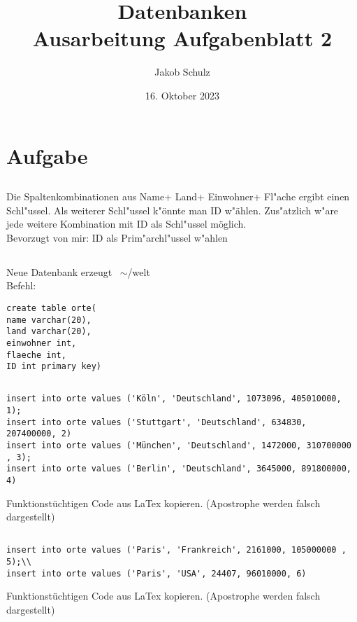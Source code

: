 \documentclass[a4paper,11pt,titlepage]{article}
\begin{document}
\title{Datenbanken\\
Ausarbeitung Aufgabenblatt 2}


\author{Jakob Schulz}


\date{16. Oktober 2023}

\maketitle{\thispagestyle{plain}}

\section{Aufgabe}

\subsection{}
Die Spaltenkombinationen aus Name+ Land+ Einwohner+ Fl"ache ergibt einen Schl"ussel. Als weiterer Schl"ussel k"önnte man ID w"ählen. Zus"atzlich w"are jede weitere Kombination mit ID als Schl"ussel möglich.\\
Bevorzugt von mir: ID als Prim"archl"ussel w"ahlen
\subsection{}
Neue Datenbank erzeugt \ $\sim$/welt\\
Befehl:
\begin{verbatim}
create table orte(
name varchar(20),
land varchar(20), 
einwohner int,
flaeche int,
ID int primary key)
\end{verbatim}

\subsection{}
\begin{verbatim}
insert into orte values ('Köln', 'Deutschland', 1073096, 405010000, 1);
insert into orte values ('Stuttgart', 'Deutschland', 634830, 207400000, 2)
insert into orte values ('München', 'Deutschland', 1472000, 310700000 , 3);
insert into orte values ('Berlin', 'Deutschland', 3645000, 891800000, 4)
\end{verbatim}
Funktionstüchtigen Code aus LaTex kopieren. (Apostrophe werden falsch dargestellt)
\subsection{}
\begin{verbatim}
insert into orte values ('Paris', 'Frankreich', 2161000, 105000000 , 5);\\
insert into orte values ('Paris', 'USA', 24407, 96010000, 6)
\end{verbatim}
Funktionstüchtigen Code aus LaTex kopieren. (Apostrophe werden falsch dargestellt)
\end{document}
